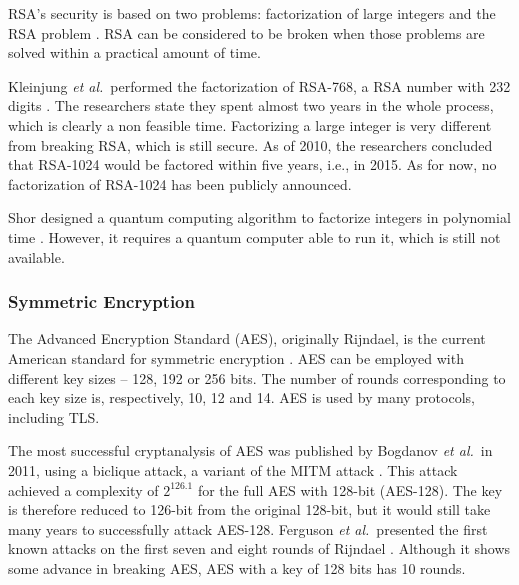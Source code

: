 \documentclass{sig-alternate-05-2015}
\begin{document}
RSA's security is based on two problems: factorization of large integers and the RSA problem \cite{Menezes1996}.
RSA can be considered to be broken when those problems are solved within a practical amount of time.

Kleinjung \emph{et al.}~performed the factorization of RSA-768, a RSA number with 232 digits \cite{Kleinjung2010}. The researchers state they spent almost two years in the whole process, which is clearly a non feasible time.
Factorizing a large integer is  very different  from breaking RSA, which is still secure.
As of 2010, the researchers concluded that RSA-1024 would be factored within five years, i.e., in 2015. As for now, no factorization of RSA-1024 has been publicly announced.

Shor designed a quantum computing algorithm to factorize integers in polynomial time \cite{Shor1995}. However, it requires a quantum computer able to run it, which is still not available.


\subsubsection{Symmetric Encryption}

The Advanced Encryption Standard (AES), originally  Rijndael, 
is the current American standard for symmetric encryption 
\cite{Rijmen2001}. AES can be employed with different key sizes -- 128, 192 or 256 bits. The number of rounds corresponding to each key size is, respectively, 10, 12 and 14.
AES is used by many protocols, including TLS. 

The most successful cryptanalysis of AES was published by Bogdanov \emph{et al.}~in 2011, using a biclique attack, a variant of the MITM attack \cite{Bogdanov2011}. 
This attack achieved a complexity of $2^{126.1}$ for the full AES with 128-bit (AES-128). The key is therefore reduced to 126-bit from the original 128-bit, but it would still take many years to successfully attack AES-128.
Ferguson \textit{et al.}~presented the first known attacks on the first seven and eight rounds of Rijndael \cite{Ferguson2001}. Although it shows some advance in breaking AES, AES with a key of 128 bits has 10 rounds.
\end{document}
